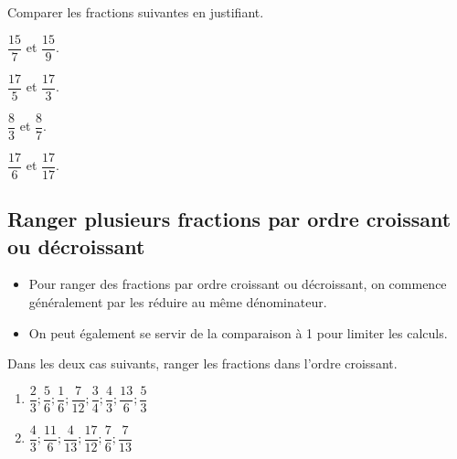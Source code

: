 \documentclass[a4paper]{book}
\begin{document}
    \begin{exemple}
        Comparer les fractions suivantes en justifiant.

        \begin{minipage}{0.24\linewidth}
            $\dfrac{15}{7}$ et $\dfrac{15}{9}$.

            \vspace{1.5cm}
        \end{minipage}
        \hfill\vline\hfill
        \begin{minipage}{0.24\linewidth}
            $\dfrac{17}{5}$ et $\dfrac{17}{3}$.

            \vspace{1.5cm}
        \end{minipage}
        \hfill\vline\hfill
        \begin{minipage}{0.24\linewidth}
            $\dfrac{8}{3}$ et $\dfrac{8}{7}$.

            \vspace{1.5cm}
        \end{minipage}
        \hfill\vline\hfill
        \begin{minipage}{0.24\linewidth}
            $\dfrac{17}{6}$ et $\dfrac{17}{17}$.

            \vspace{1.5cm}
        \end{minipage}
    \end{exemple}


\subsection{Ranger plusieurs fractions par ordre croissant ou décroissant}
    \begin{methode}
        \begin{itemize}[leftmargin=*]
            \item Pour ranger des fractions par ordre croissant ou décroissant, on commence généralement par les réduire au même dénominateur.

            \item On peut également se servir de la comparaison à 1 pour limiter les calculs.
        \end{itemize}
    \end{methode}


    \begin{exemple}
        Dans les deux cas suivants, ranger les fractions dans l'ordre croissant.
        \begin{enumerate}[leftmargin=*]
            \item $\dfrac{2}{3}; \dfrac{5}{6}; \dfrac{1}{6}; \dfrac{7}{12}; \dfrac{3}{4}; \dfrac{4}{3}; \dfrac{13}{6}; \dfrac{5}{3}$

            \medskip

            \item $\dfrac{4}{3}; \dfrac{11}{6}; \dfrac{4}{13}; \dfrac{17}{12}; \dfrac{7}{6}; \dfrac{7}{13}$
        \end{enumerate}
    \end{exemple}
    
    
\end{document}
